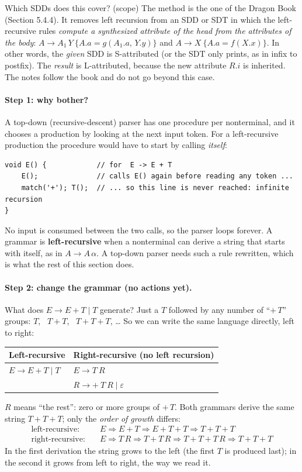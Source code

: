 \documentclass[11pt,a4paper]{article}
\begin{document}
\begin{notebox}{Which SDDs does this cover? (scope)}
The method is the one of the Dragon Book (Section 5.4.4). It removes left recursion from an SDD or SDT in which the left-recursive rules \emph{compute a synthesized attribute of the head from the attributes of the body}: $A\to A_1\,Y\ \{A.a=g(A_1.a,\,Y.y)\}$ and $A\to X\ \{A.a=f(X.x)\}$. In other words, the \emph{given} SDD is S-attributed (or the SDT only prints, as in infix to postfix). The \emph{result} is L-attributed, because the new attribute $R.i$ is inherited. The notes follow the book and do not go beyond this case.
\end{notebox}

\paragraph{Step 1: why bother?} A top-down (recursive-descent) parser has one procedure per nonterminal, and it chooses a production by looking at the next input token. For a left-recursive production the procedure would have to start by calling \emph{itself}:
\begin{lstlisting}
void E() {            // for  E -> E + T
    E();              // calls E() again before reading any token ...
    match('+'); T();  // ... so this line is never reached: infinite recursion
}
\end{lstlisting}
No input is consumed between the two calls, so the parser loops forever. A grammar is \textbf{left-recursive} when a nonterminal can derive a string that starts with itself, as in $A\to A\,\alpha$. A top-down parser needs such a rule rewritten, which is what the rest of this section does.

\paragraph{Step 2: change the grammar (no actions yet).} What does $E\to E+T\mid T$ generate? Just a $T$ followed by any number of ``$+\,T$'' groups: $T$, \ $T+T$, \ $T+T+T$, \dots{} So we can write the same language directly, left to right:
\begin{center}
\small
\begin{tabular}{@{}l l@{}}
\toprule
\textbf{Left-recursive} & \textbf{Right-recursive (no left recursion)} \\ \midrule
$E \to E + T \mid T$ & $E \to T\ R$ \\
 & $R \to +\ T\ R \mid \varepsilon$ \\ \bottomrule
\end{tabular}
\end{center}
$R$ means ``the rest'': zero or more groups of $+\,T$. Both grammars derive the same string $T+T+T$; only the \emph{order of growth} differs:
\begin{align*}
\text{left-recursive:}\quad & E \Rightarrow E+T \Rightarrow E+T+T \Rightarrow T+T+T\\
\text{right-recursive:}\quad & E \Rightarrow T\,R \Rightarrow T+T\,R \Rightarrow T+T+T\,R \Rightarrow T+T+T
\end{align*}
In the first derivation the string grows to the left (the first $T$ is produced last); in the second it grows from left to right, the way we read it.
\end{document}
